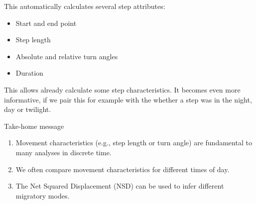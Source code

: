 \documentclass[ignorenonframetext,,t]{beamer}
\providecommand{\tightlist}{%
\setlength{\itemsep}{0pt}\setlength{\parskip}{0pt}}
\providecommand{\tightlist}{%
\setlength{\itemsep}{0pt}\setlength{\parskip}{0pt}}
\renewcommand{\tightlist}{\setlength{\itemsep}{1.4ex}\setlength{\parskip}{0pt}}
\begin{document}
\begin{frame}
This automatically calculates several step attributes:

\begin{itemize}
\tightlist
\item
  Start and end point
\item
  Step length
\item
  Absolute and relative turn angles
\item
  Duration
\end{itemize}

This allows already calculate some step characteristics. It becomes even
more informative, if we pair this for example with the whether a step
was in the night, day or twilight.
\end{frame}


\begin{frame}{Take-home message}
\protect\hypertarget{take-home-message}{}
\begin{enumerate}
\tightlist
\item
  Movement characteristics (e.g., step length or turn angle) are
  fundamental to many analyses in discrete time.
\item
  We often compare movement characteristics for different times of day.
\item
  The Net Squared Displacement (NSD) can be used to infer different
  migratory modes.
\end{enumerate}
\end{frame}
\end{document}

